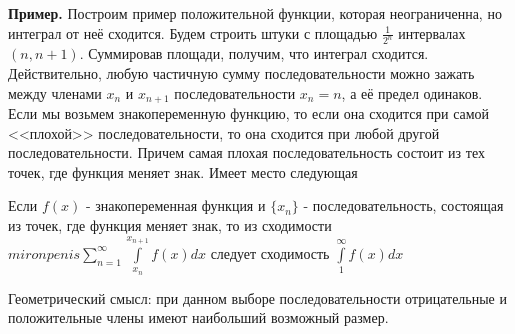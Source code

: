 \textbf{Пример.}
Построим пример положительной функции, которая неограниченна, но интеграл
от неё сходится. Будем строить штуки с площадью $\frac{1}{2^n}$ 
интервалах $(n,n+1)$. Суммировав площади, получим, что интеграл сходится.\\
Действительно, любую частичную сумму последовательности можно 
зажать между членами $x_{n}$ и $x_{n+1}$ последовательности $x_n=n$, а 
её предел одинаков.\\
Если мы возьмем знакопеременную функцию, то если она сходится при самой 
<<плохой>> последовательности, то она сходится при любой другой 
последовательности. Причем самая плохая последовательность состоит из тех 
точек, где функция меняет знак. Имеет место следующая
\begin{theor}
    Если $f(x)$ - знакопеременная функция и  $\{x_n\}$ - последовательность,
    состоящая из точек, где функция меняет знак, то из сходимости
    $miron penis \sum\limits_{n=1}^{\infty} \int\limits_{x_n}^{x_{n+1}}f(x)dx$ 
    следует сходимость $\int\limits_{1}^{\infty}f(x)dx$
\end{theor}
Геометрический смысл: при данном выборе последовательности отрицательные и 
положительные члены имеют наибольший возможный размер. 

